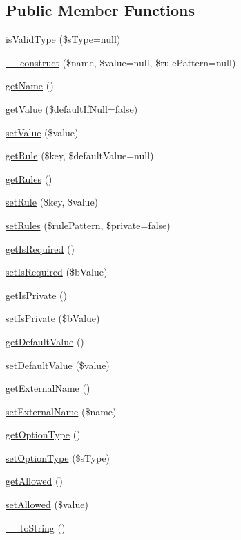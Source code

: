 \subsection*{Public Member Functions}
\begin{DoxyCompactItemize}
\item 
\hyperlink{classCPSOption_af95d42816651ce87c91ac3df15b2cc63}{isValidType} (\$sType=null)
\item 
\hyperlink{classCPSOption_acadb0b05b1c434157e21e0551c2ca725}{\_\-\_\-construct} (\$name, \$value=null, \$rulePattern=null)
\item 
\hyperlink{classCPSOption_a3d0963e68bb313b163a73f2803c64600}{getName} ()
\item 
\hyperlink{classCPSOption_aabb9562c82b18321ed0510932298be7c}{getValue} (\$defaultIfNull=false)
\item 
\hyperlink{classCPSOption_a7494441b6ed08a391704971873f31432}{setValue} (\$value)
\item 
\hyperlink{classCPSOption_a8803b9be3676330a9791b823d0d3f5f6}{getRule} (\$key, \$defaultValue=null)
\item 
\hyperlink{classCPSOption_a85c15a4eb3192c0e23b1a7355052ba18}{getRules} ()
\item 
\hyperlink{classCPSOption_a7449ef6f7e3fed98d2b777570d25a11c}{setRule} (\$key, \$value)
\item 
\hyperlink{classCPSOption_af26f441186ec53723e892616baec1c73}{setRules} (\$rulePattern, \$private=false)
\item 
\hyperlink{classCPSOption_ad21b6f2377a3af9fcacb3bd31451db2d}{getIsRequired} ()
\item 
\hyperlink{classCPSOption_a960646066f35999ba82ba1e749eedd4a}{setIsRequired} (\$bValue)
\item 
\hyperlink{classCPSOption_abfb7b68551a4c558d2fb5b25f1e5f7c5}{getIsPrivate} ()
\item 
\hyperlink{classCPSOption_acba98ae8b1edffabd170f04891c25f94}{setIsPrivate} (\$bValue)
\item 
\hyperlink{classCPSOption_af9b9401c63918169457fe8516324950f}{getDefaultValue} ()
\item 
\hyperlink{classCPSOption_a2a04219362d622a6d86072bae708469a}{setDefaultValue} (\$value)
\item 
\hyperlink{classCPSOption_a3028a37affd62d3f7fe0052a2df42c28}{getExternalName} ()
\item 
\hyperlink{classCPSOption_a9efd949e8d6199e3b763606fe2424159}{setExternalName} (\$name)
\item 
\hyperlink{classCPSOption_a2f1e46cc33a0f8eb5075dd312c3a189b}{getOptionType} ()
\item 
\hyperlink{classCPSOption_a0312d1a729054ab2ab1cb63920d7e7bc}{setOptionType} (\$sType)
\item 
\hyperlink{classCPSOption_adf60de89939a47330ff3273b62a7d60c}{getAllowed} ()
\item 
\hyperlink{classCPSOption_a3b21d5943795b97b62d56582bf4bfdc6}{setAllowed} (\$value)
\item 
\hyperlink{classCPSOption_a7516ca30af0db3cdbf9a7739b48ce91d}{\_\-\_\-toString} ()
\end{DoxyCompactItemize}
